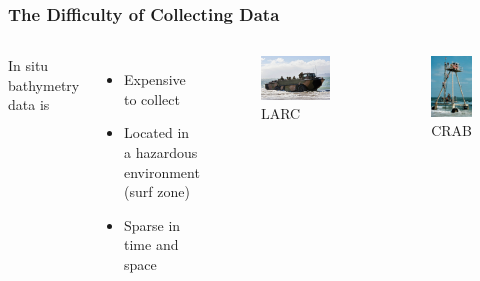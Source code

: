 \documentclass[7pt]{beamer}
\begin{document}
\begin{frame}
\frametitle{The Difficulty of Collecting Data}
\begin{columns}
In situ bathymetry data is
\begin{itemize}
 \item Expensive to collect
 \item Located in a hazardous environment (surf zone)
 \item Sparse in time and space
\end{itemize}
\begin{figure}[h!]
\includegraphics[width=.80\linewidth]{img/LARC2.jpg}\hfill
\centering
\captionsetup{labelformat=empty}
\caption{LARC}
\end{figure}
\begin{figure}[h]
\includegraphics[width=.6\linewidth]{img/CRAB3.JPG}
\captionsetup{labelformat=empty}
\caption{CRAB}
\end{figure}


\end{columns}

\end{frame}
\end{document}
